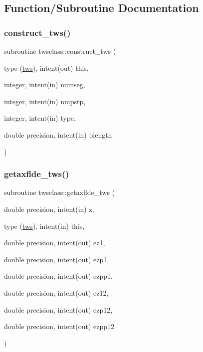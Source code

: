 \subsection{Function/\+Subroutine Documentation}
\mbox{\label{namespacetwsclass_a6528e082bfe1d870e027de8353b312c7}} 
\subsubsection{\texorpdfstring{construct\_tws()}{construct\_tws()}}
{\footnotesize\ttfamily subroutine twsclass\+::construct\+\_\+tws (\begin{DoxyParamCaption}\item[{type (\mbox{\hyperlink{namespacetwsclass_structtwsclass_1_1tws}{tws}}), intent(out)}]{this,  }\item[{integer, intent(in)}]{numseg,  }\item[{integer, intent(in)}]{nmpstp,  }\item[{integer, intent(in)}]{type,  }\item[{double precision, intent(in)}]{blength }\end{DoxyParamCaption})}

\mbox{\label{namespacetwsclass_a9c88e1753c1d3faff3af95cf8c071d4f}} 
\subsubsection{\texorpdfstring{getaxflde\_tws()}{getaxflde\_tws()}}
{\footnotesize\ttfamily subroutine twsclass\+::getaxflde\+\_\+tws (\begin{DoxyParamCaption}\item[{double precision, intent(in)}]{z,  }\item[{type (\mbox{\hyperlink{namespacetwsclass_structtwsclass_1_1tws}{tws}}), intent(in)}]{this,  }\item[{double precision, intent(out)}]{ez1,  }\item[{double precision, intent(out)}]{ezp1,  }\item[{double precision, intent(out)}]{ezpp1,  }\item[{double precision, intent(out)}]{ez12,  }\item[{double precision, intent(out)}]{ezp12,  }\item[{double precision, intent(out)}]{ezpp12 }\end{DoxyParamCaption})}



